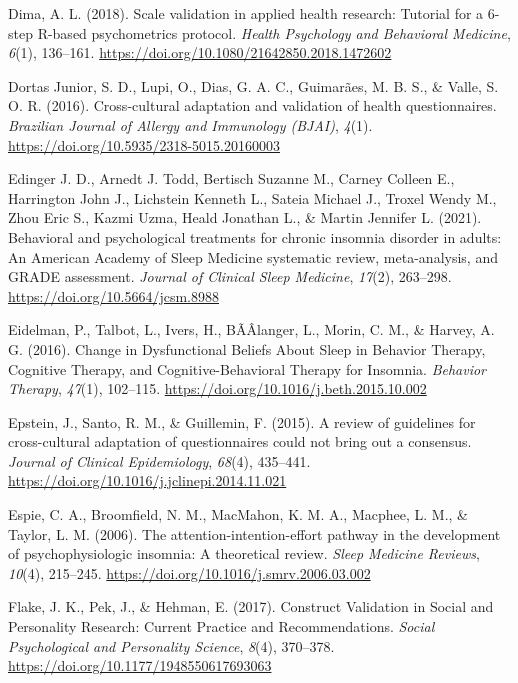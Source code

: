 \documentclass[
  ,doc,11pt, twoside,floatsintext]{apa6}
\newlength{\cslhangindent}
\newlength{\cslentryspacingunit} %
\newenvironment{CSLReferences}[2] %
 {%
  \setlength{\parindent}{0pt}
  \ifodd #1
  \let\oldpar\par
  \def\par{\hangindent=\cslhangindent\oldpar}
  \fi
  \setlength{\parskip}{#2\cslentryspacingunit}
 }%
 {}
\begin{document}
\begin{CSLReferences}{1}{0}
\leavevmode{}%
Dima, A. L. (2018). Scale validation in applied health research: Tutorial for a 6-step {R-based} psychometrics protocol. \emph{Health Psychology and Behavioral Medicine}, \emph{6}(1), 136--161. \url{https://doi.org/10.1080/21642850.2018.1472602}

\leavevmode{}%
Dortas Junior, S. D., Lupi, O., Dias, G. A. C., Guimarães, M. B. S., \& Valle, S. O. R. (2016). {Cross-cultural adaptation and validation of health questionnaires}. \emph{Brazilian Journal of Allergy and Immunology (BJAI)}, \emph{4}(1). \url{https://doi.org/10.5935/2318-5015.20160003}

\leavevmode{}%
Edinger J. D., Arnedt J. Todd, Bertisch Suzanne M., Carney Colleen E., Harrington John J., Lichstein Kenneth L., Sateia Michael J., Troxel Wendy M., Zhou Eric S., Kazmi Uzma, Heald Jonathan L., \& Martin Jennifer L. (2021). Behavioral and psychological treatments for chronic insomnia disorder in adults: An {American Academy} of {Sleep Medicine} systematic review, meta-analysis, and {GRADE} assessment. \emph{Journal of Clinical Sleep Medicine}, \emph{17}(2), 263--298. \url{https://doi.org/10.5664/jcsm.8988}

\leavevmode{}%
Eidelman, P., Talbot, L., Ivers, H., BÃÂlanger, L., Morin, C. M., \& Harvey, A. G. (2016). Change in {Dysfunctional Beliefs About Sleep} in {Behavior Therapy}, {Cognitive Therapy}, and {Cognitive-Behavioral Therapy} for {Insomnia}. \emph{Behavior Therapy}, \emph{47}(1), 102--115. \url{https://doi.org/10.1016/j.beth.2015.10.002}

\leavevmode{}%
Epstein, J., Santo, R. M., \& Guillemin, F. (2015). A review of guidelines for cross-cultural adaptation of questionnaires could not bring out a consensus. \emph{Journal of Clinical Epidemiology}, \emph{68}(4), 435--441. \url{https://doi.org/10.1016/j.jclinepi.2014.11.021}

\leavevmode{}%
Espie, C. A., Broomfield, N. M., MacMahon, K. M. A., Macphee, L. M., \& Taylor, L. M. (2006). The attention-intention-effort pathway in the development of psychophysiologic insomnia: A theoretical review. \emph{Sleep Medicine Reviews}, \emph{10}(4), 215--245. \url{https://doi.org/10.1016/j.smrv.2006.03.002}

\leavevmode{}%
Flake, J. K., Pek, J., \& Hehman, E. (2017). Construct {Validation} in {Social} and {Personality Research}: {Current Practice} and {Recommendations}. \emph{Social Psychological and Personality Science}, \emph{8}(4), 370--378. \url{https://doi.org/10.1177/1948550617693063}


\end{CSLReferences}
\end{document}
